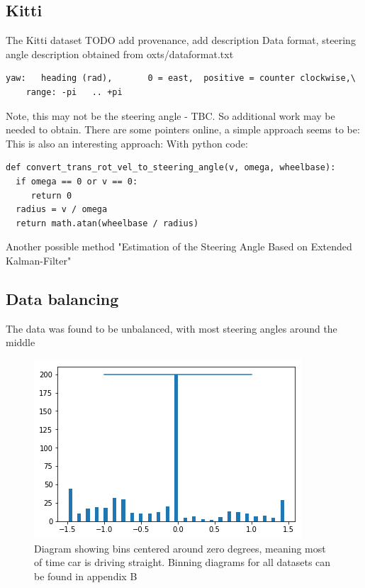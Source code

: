 
\subsection{Kitti}

The Kitti dataset TODO add provenance, add description
Data format, steering angle description obtained from oxts/dataformat.txt 
\begin{verbatim}
yaw:   heading (rad),       0 = east,  positive = counter clockwise,\
    range: -pi   .. +pi
\end{verbatim}
Note, this may not be the steering angle - TBC. So additional work may be needed to obtain.
There are some pointers online, a simple approach seems to be:
This is also an interesting approach:
With python code:
\begin{verbatim}
def convert_trans_rot_vel_to_steering_angle(v, omega, wheelbase):
  if omega == 0 or v == 0:
     return 0
  radius = v / omega
  return math.atan(wheelbase / radius)    
\end{verbatim}
Another possible method "Estimation of the Steering Angle Based on Extended Kalman-Filter"  

\subsection{Data balancing}

The data was found to be unbalanced, with most steering angles around the middle
\begin{figure}[ht]
 \centering 
 \includegraphics[scale=1]{Figures/bins.png}
 \caption{Diagram showing bins centered around zero degrees, meaning most of time car is driving straight. Binning diagrams for all datasets can be found in appendix B}
 \label{fig:bins-placeholder}
\end{figure}

